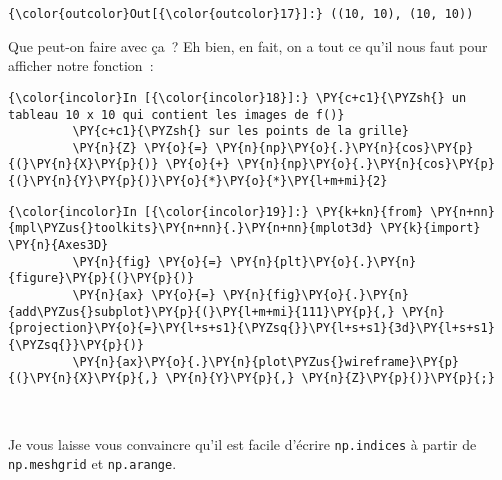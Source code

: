 \begin{Verbatim}[commandchars=\\\{\}]
{\color{outcolor}Out[{\color{outcolor}17}]:} ((10, 10), (10, 10))
\end{Verbatim}
            
    Que peut-on faire avec ça~? Eh bien, en fait, on a tout ce qu'il nous
faut pour afficher notre fonction~:

    \begin{Verbatim}[commandchars=\\\{\}]
{\color{incolor}In [{\color{incolor}18}]:} \PY{c+c1}{\PYZsh{} un tableau 10 x 10 qui contient les images de f()}
         \PY{c+c1}{\PYZsh{} sur les points de la grille}
         \PY{n}{Z} \PY{o}{=} \PY{n}{np}\PY{o}{.}\PY{n}{cos}\PY{p}{(}\PY{n}{X}\PY{p}{)} \PY{o}{+} \PY{n}{np}\PY{o}{.}\PY{n}{cos}\PY{p}{(}\PY{n}{Y}\PY{p}{)}\PY{o}{*}\PY{o}{*}\PY{l+m+mi}{2}
\end{Verbatim}


    \begin{Verbatim}[commandchars=\\\{\}]
{\color{incolor}In [{\color{incolor}19}]:} \PY{k+kn}{from} \PY{n+nn}{mpl\PYZus{}toolkits}\PY{n+nn}{.}\PY{n+nn}{mplot3d} \PY{k}{import} \PY{n}{Axes3D}
         \PY{n}{fig} \PY{o}{=} \PY{n}{plt}\PY{o}{.}\PY{n}{figure}\PY{p}{(}\PY{p}{)}
         \PY{n}{ax} \PY{o}{=} \PY{n}{fig}\PY{o}{.}\PY{n}{add\PYZus{}subplot}\PY{p}{(}\PY{l+m+mi}{111}\PY{p}{,} \PY{n}{projection}\PY{o}{=}\PY{l+s+s1}{\PYZsq{}}\PY{l+s+s1}{3d}\PY{l+s+s1}{\PYZsq{}}\PY{p}{)}
         \PY{n}{ax}\PY{o}{.}\PY{n}{plot\PYZus{}wireframe}\PY{p}{(}\PY{n}{X}\PY{p}{,} \PY{n}{Y}\PY{p}{,} \PY{n}{Z}\PY{p}{)}\PY{p}{;}
\end{Verbatim}


    \begin{center}
    \end{center}
    { \hspace*{\fill} \\}
    
    Je vous laisse vous convaincre qu'il est facile d'écrire
\texttt{np.indices} à partir de \texttt{np.meshgrid} et
\texttt{np.arange}.


    
    
    
